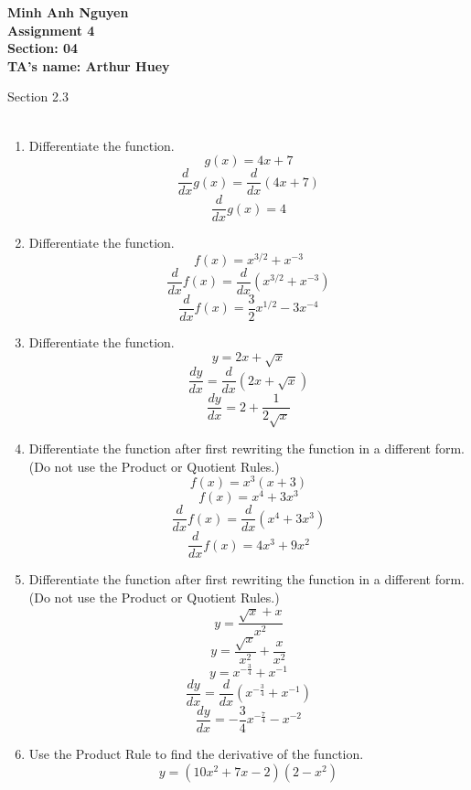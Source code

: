 \documentclass[12pt]{article}
\begin{document}
\textbf{Minh Anh Nguyen }\\
\textbf{Assignment 4}\\
\textbf{Section: 04}\\
\textbf{TA's name: Arthur Huey}

\hrulefill

Section 2.3\\~\\

\begin{enumerate}
      \item Differentiate the function.
            \[g(x) = 4x + 7\]
            \[{\displaystyle \frac{d}{dx} g(x) = \frac{d}{dx}(4x+7)}\]
            \[\boxed{{\displaystyle \frac{d}{dx} g(x) = 4}}\]
            \setcounter{enumi}{6}
      \item Differentiate the function.
            \[{\displaystyle f(x) = x^{3/2} + x^{-3}}\]
            \[{\displaystyle \frac{d}{dx}f(x) = \frac{d}{dx}(x^{3/2} + x^{-3})}\]
            \[\boxed{{\displaystyle \frac{d}{dx}f(x) = \frac{3}{2}x^{1/2} -3 x^{-4}}}\]
            \setcounter{enumi}{10}
      \item Differentiate the function.
            \[{\displaystyle y = 2x + \sqrt{x}}\]
            \[{\displaystyle \frac{dy}{dx} = \frac{d}{dx}(2x + \sqrt{x})}\]
            \[\boxed{\displaystyle \frac{dy}{dx} = 2 + \frac{1}{2\sqrt{x}}}\]
            \setcounter{enumi}{14}
      \item Differentiate the function after first rewriting the function in a different form. (Do not use the Product or Quotient Rules.)
            \[f(x) = x^3(x+3)\]
            \[f(x) = x^4+3x^3\]
            \[{\displaystyle \frac{d}{dx}f(x) = \frac{d}{dx}(x^4+3x^3)}\]
            \[\boxed{\displaystyle \frac{d}{dx}f(x) = 4x^3+9x^2}\]
            \setcounter{enumi}{17}
      \item Differentiate the function after first rewriting the function in a different form. (Do not use the Product or Quotient Rules.)
            \[{\displaystyle y = \frac{\sqrt{x} + x}{x^2}}\]
            \[{\displaystyle y = \frac{\sqrt{x}}{x^2} + \frac{x}{x^2}}\]
            \[{\displaystyle y = x^{-\frac{3}{4}} + x^{-1}}\]
            \[{\displaystyle \frac{dy}{dx} = \frac{d}{dx}(x^{-\frac{3}{4}} + x^{-1})}\]
            \[\boxed{\displaystyle \frac{dy}{dx} = -\frac{3}{4}x^{-\frac{7}{4}} - x^{-2}}\]
            \setcounter{enumi}{29}
      \item Use the Product Rule to find the derivative of the function.
            \[y = (10x^2 + 7x -2)(2-x^2)\]

\end{enumerate}
\end{document}
